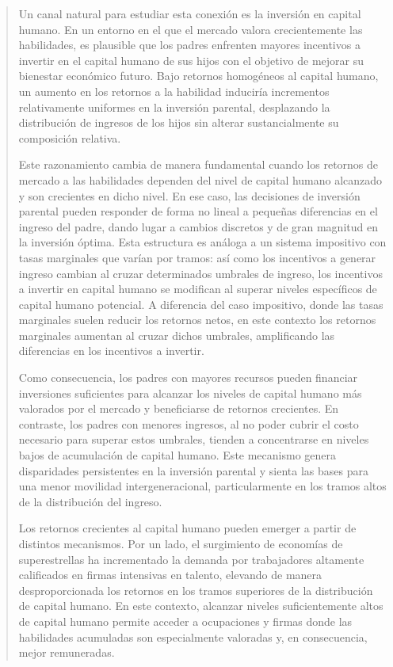 \documentclass[12pt]{article}
\begin{document}
\begin{abstract}
Un canal natural para estudiar esta conexión es la inversión en capital humano. En un entorno en el que el mercado valora crecientemente las habilidades, es plausible que los padres enfrenten mayores incentivos a invertir en el capital humano de sus hijos con el objetivo de mejorar su bienestar económico futuro. Bajo retornos homogéneos al capital humano, un aumento en los retornos a la habilidad induciría incrementos relativamente uniformes en la inversión parental, desplazando la distribución de ingresos de los hijos sin alterar sustancialmente su composición relativa.

Este razonamiento cambia de manera fundamental cuando los retornos de mercado a las habilidades dependen del nivel de capital humano alcanzado y son crecientes en dicho nivel. En ese caso, las decisiones de inversión parental pueden responder de forma no lineal a pequeñas diferencias en el ingreso del padre, dando lugar a cambios discretos y de gran magnitud en la inversión óptima. Esta estructura es análoga a un sistema impositivo con tasas marginales que varían por tramos: así como los incentivos a generar ingreso cambian al cruzar determinados umbrales de ingreso, los incentivos a invertir en capital humano se modifican al superar niveles específicos de capital humano potencial. A diferencia del caso impositivo, donde las tasas marginales suelen reducir los retornos netos, en este contexto los retornos marginales aumentan al cruzar dichos umbrales, amplificando las diferencias en los incentivos a invertir.

Como consecuencia, los padres con mayores recursos pueden financiar inversiones suficientes para alcanzar los niveles de capital humano más valorados por el mercado y beneficiarse de retornos crecientes. En contraste, los padres con menores ingresos, al no poder cubrir el costo necesario para superar estos umbrales, tienden a concentrarse en niveles bajos de acumulación de capital humano. Este mecanismo genera disparidades persistentes en la inversión parental y sienta las bases para una menor movilidad intergeneracional, particularmente en los tramos altos de la distribución del ingreso.

Los retornos crecientes al capital humano pueden emerger a partir de distintos mecanismos. Por un lado, el surgimiento de economías de superestrellas \parencite{Rosen_1983,Autor_2020} ha incrementado la demanda por trabajadores altamente calificados en firmas intensivas en talento, elevando de manera desproporcionada los retornos en los tramos superiores de la distribución de capital humano. En este contexto, alcanzar niveles suficientemente altos de capital humano permite acceder a ocupaciones y firmas donde las habilidades acumuladas son especialmente valoradas y, en consecuencia, mejor remuneradas.


\end{abstract}
\end{document}
